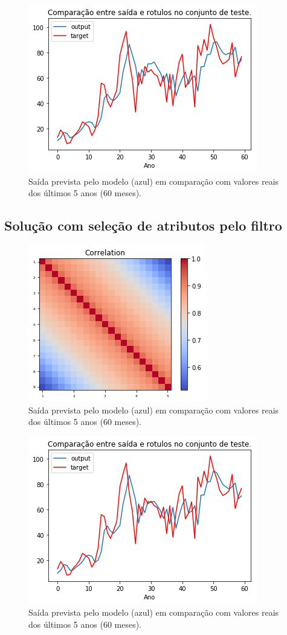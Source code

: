 \documentclass[a4paper, 12pt]{article}
\begin{document}
\begin{figure}[h!]
  \includegraphics{images/wrapper.png}
    \caption{Saída prevista pelo modelo (azul) em comparação com valores reais dos últimos 5 anos (60 meses).}
\end{figure}

\subsection*{Solução com seleção de atributos pelo filtro}

\begin{figure}[h!]
  \includegraphics{images/corr.png}
    \caption{Saída prevista pelo modelo (azul) em comparação com valores reais dos últimos 5 anos (60 meses).}
\end{figure}

\begin{figure}[h!]
  \includegraphics{images/filter.png}
    \caption{Saída prevista pelo modelo (azul) em comparação com valores reais dos últimos 5 anos (60 meses).}
\end{figure}
\end{document}
